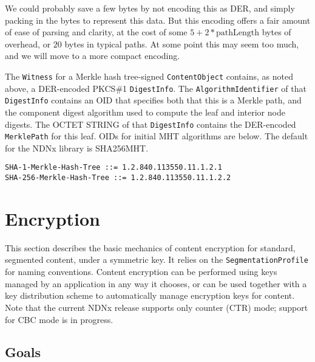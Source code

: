 We could probably save a few bytes by not encoding this as DER, and
simply packing in the bytes to represent this data. But this encoding
offers a fair amount of ease of parsing and clarity, at the cost of
some $5 + 2*\mbox{pathLength}$ bytes of overhead, or $20$ bytes in
typical paths. At some point this may seem too much, and we will move
to a more compact encoding.

The {\tt Witness} for a Merkle hash tree-signed {\tt ContentObject}
contains, as noted above, a DER-encoded PKCS\#1 {\tt DigestInfo}. The
{\tt AlgorithmIdentifier} of that {\tt DigestInfo} contains an OID
that specifies both that this is a Merkle path, and the component
digest algorithm used to compute the leaf and interior node
digests. The OCTET STRING of that {\tt DigestInfo} contains the
DER-encoded {\tt MerklePath} for this leaf. OIDs for initial MHT
algorithms are below. The default for the NDNx library is SHA256MHT.

\begin{verbatim}
SHA-1-Merkle-Hash-Tree ::= 1.2.840.113550.11.1.2.1  
SHA-256-Merkle-Hash-Tree ::= 1.2.840.113550.11.1.2.2
\end{verbatim}

\newpage


\section{Encryption}
\label{sec:BasicEncryption}

This section describes the basic mechanics of content encryption for
standard, segmented content, under a symmetric key. It relies on the
{\tt SegmentationProfile} for naming conventions.  Content encryption
can be performed using keys managed by an application in any way it
chooses, or can be used together with a key distribution scheme to
automatically manage encryption keys for content. Note that the current
NDNx release supports only counter (CTR) mode; support for CBC mode
is in progress.

\subsection{Goals}

